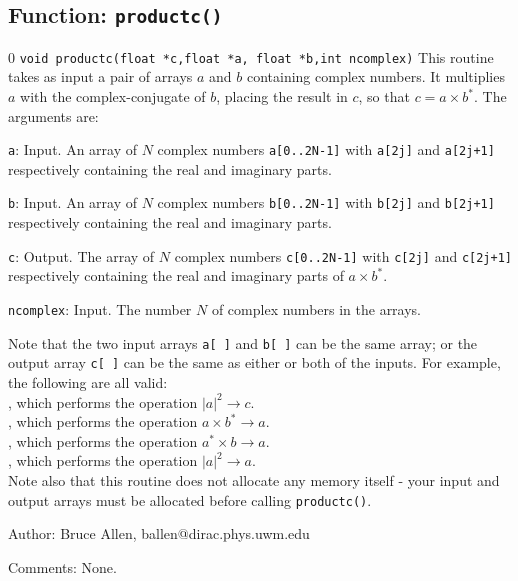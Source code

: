 \subsection{Function: \tt productc()}
\setcounter{equation}0
{\tt void productc(float *c,float *a, float *b,int ncomplex)}
This routine takes as input a pair of arrays $a$ and $b$ containing
complex numbers.  It multiplies $a$ with the complex-conjugate of $b$,
placing the result in $c$, so that $c = a \times b^*$.
The arguments are:
\begin{description}
\item{\tt a}: Input.  An array of $N$ complex numbers {\tt a[0..2N-1]} with
  {\tt a[2j]} and {\tt a[2j+1]} respectively containing the real and
  imaginary parts.
\item{\tt b}: Input.  An array of $N$ complex numbers {\tt b[0..2N-1]} with
  {\tt b[2j]} and {\tt b[2j+1]} respectively containing the real and
  imaginary parts.
\item{\tt c}: Output.  The array of $N$ complex numbers {\tt c[0..2N-1]} with
  {\tt c[2j]} and {\tt c[2j+1]} respectively containing the real and
  imaginary parts of $a \times b^*$.
\item{\tt ncomplex}: Input.   The number $N$ of complex numbers in the arrays.
\end{description}
Note that the two input arrays {\tt a[ ]} and {\tt b[ ]} can be the same
array; or the output array {\tt c[ ]} can be the same as either or both of
the inputs.  For example, the following are all valid:\\
, which performs the operation $|a|^2 \rightarrow c$. \\
, which performs the operation $a \times b^* \rightarrow a$. \\
, which performs the operation $a^* \times b \rightarrow a$. \\
, which performs the operation $|a|^2 \rightarrow a$.\\
Note also that this routine does not allocate any memory itself - your input
and output arrays must be allocated before calling {\tt productc()}.
\begin{description}
\item{Author:}
Bruce Allen, ballen@dirac.phys.uwm.edu
\item{Comments:}
None.
\end{description}
\clearpage

